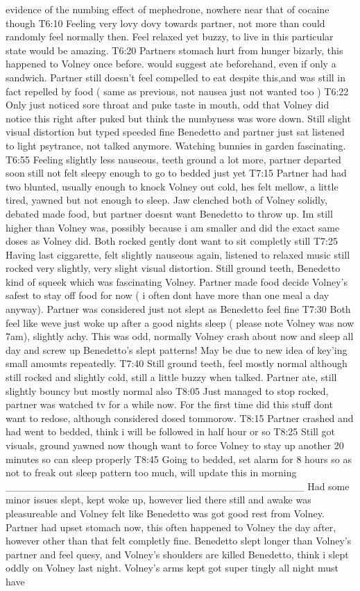 \documentclass[12pt]{book}
\begin{document}
evidence of the numbing effect of mephedrone, nowhere near that of cocaine though T6:10 Feeling very lovy dovy towards partner, not more than could randomly feel normally then. Feel relaxed yet buzzy, to live in this particular state would be amazing. T6:20 Partners stomach hurt from hunger bizarly, this happened to Volney once before. would suggest ate beforehand, even if only a sandwich. Partner still doesn't feel compelled to eat despite this,and was still in fact repelled by food ( same as previous, not nausea just not wanted too ) T6:22 Only just noticed sore throat and puke taste in mouth, odd that Volney did notice this right after puked but think the numbyness was wore down. Still slight visual distortion but typed speeded fine Benedetto and partner just sat listened to light psytrance, not talked anymore. Watching bunnies in garden fascinating. T6:55 Feeling slightly less nauseous, teeth ground a lot more, partner departed soon still not felt sleepy enough to go to bedded just yet T7:15 Partner had had two blunted, usually enough to knock Volney out cold, hes felt mellow, a little tired, yawned but not enough to sleep. Jaw clenched both of Volney solidly, debated made food, but partner doesnt want Benedetto to throw up. Im still higher than Volney was, possibly because i am smaller and did the exact same doses as Volney did. Both rocked gently dont want to sit completly still T7:25 Having last ciggarette, felt slightly nauseous again, listened to relaxed music still rocked very slightly, very slight visual distortion. Still ground teeth, Benedetto kind of squeek which was fascinating Volney. Partner made food decide Volney's safest to stay off food for now ( i often dont have more than one meal a day anyway). Partner was considered just not slept as Benedetto feel fine T7:30 Both feel like weve just woke up after a good nights sleep ( please note Volney was now 7am), slightly achy. This was odd, normally Volney crash about now and sleep all day and screw up Benedetto's slept patterns! May be due to new idea of key'ing small amounts repeatedly. T7:40 Still ground teeth, feel mostly normal although still rocked and slightly cold, still a little buzzy when talked. Partner ate, still slightly bouncy but mostly normal also T8:05 Just managed to stop rocked, partner was watched tv for a while now. For the first time did this stuff dont want to redose, although considered dosed tommorow. T8:15 Partner crashed and had went to bedded, think i will be followed in half hour or so T8:25 Still got visuals, ground yawned now though want to force Volney to stay up another 20 minutes so can sleep properly T8:45 Going to bedded, set alarm for 8 hours so as not to freak out sleep pattern too much, will update this in morning \_\_\_\_\_\_\_\_\_\_\_\_\_\_\_\_\_\_\_\_\_\_\_\_\_\_\_\_\_\_\_\_\_\_\_\_\_\_\_\_\_ Had some minor issues slept, kept woke up, however lied there still and awake was pleasureable and Volney felt like Benedetto was got good rest from Volney. Partner had upset stomach now, this often happened to Volney the day after, however other than that felt completly fine. Benedetto slept longer than Volney's partner and feel quesy, and Volney's shoulders are killed Benedetto, think i slept oddly on Volney last night. Volney's arms kept got super tingly all night must have 
\end{document}
